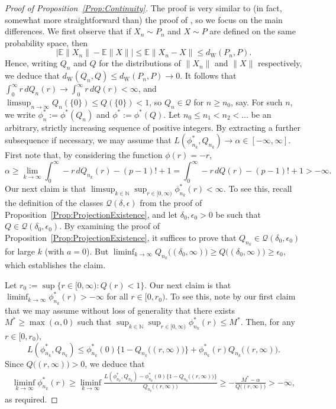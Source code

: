 \documentclass[a4paper,12pt]{article}
\begin{document}
\begin{proof}[Proof of Proposition~\ref{Prop:Continuity}]
The proof is very similar to (in fact, somewhat more straightforward than) the proof of \citet[][Theorem~4.5]{dumbgen2011approximation}, so we focus on the main differences.  We first observe that if $X_n \sim P_n$ and $X \sim P$ are defined on the same probability space, then 
\[
\bigl|\mathbb{E}\|X_n\| - \mathbb{E}\|X\|\bigr| \leq \mathbb{E}\|X_n-X\| \leq d_\mathrm{W}(P_n,P).
\]
Hence, writing $Q_n$ and $Q$ for the distributions of $\|X_n\|$ and $\|X\|$ respectively, we deduce that $d_\mathrm{W}(Q_n,Q) \leq d_\mathrm{W}(P_n,P) \rightarrow 0$.  It follows that $\int_0^\infty r \, dQ_n(r) \rightarrow \int_0^\infty r \, dQ(r) < \infty$, and $\limsup_{n \rightarrow \infty} Q_n(\{0\}) \leq Q(\{0\}) < 1$, so $Q_n \in \mathcal{Q}$ for $n \geq n_0$, say.  For such $n$, we write $\phi_n^* := \phi^*(Q_n)$ and $\phi^* := \phi^*(Q)$.  Let $n_0 \leq n_1 < n_2 < \ldots$ be an arbitrary, strictly increasing sequence of positive integers.  By extracting a further subsequence if necessary, we may assume that $L(\phi_{n_k}^*,Q_{n_k}) \rightarrow \alpha \in [-\infty,\infty]$.  First note that, by considering the function $\phi(r) = -r$,
\[
\alpha \geq \lim_{k \rightarrow \infty} \int_0^\infty -r \, dQ_{n_k}(r) - (p-1)! + 1 = \int_0^\infty -r \, dQ(r) - (p-1)! + 1 > -\infty.
\]
Our next claim is that $\limsup_{k \in \mathbb{N}} \sup_{r \in [0,\infty)} \phi_{n_k}^*(r) < \infty$.  To see this, recall the definition of the classes $\mathcal{Q}(\delta,\epsilon)$ from the proof of Proposition~\ref{Prop:ProjectionExistence}, and let $\delta_0,\epsilon_0 > 0$ be such that $Q \in \mathcal{Q}(\delta_0,\epsilon_0)$.  By examining the proof of Proposition~\ref{Prop:ProjectionExistence}, it suffices to prove that $Q_{n_k} \in \mathcal{Q}(\delta_0,\epsilon_0)$ for large $k$ (with $a=0$).  But $\liminf_{k \rightarrow \infty} Q_{n_k}\bigl((\delta_0,\infty)\bigr) \geq Q\bigl((\delta_0,\infty)\bigr) \geq \epsilon_0$, which establishes the claim.

Let $r_0 := \sup\{r \in [0,\infty):Q(r) < 1\}$.  Our next claim is that $\liminf_{k \rightarrow \infty} \phi_{n_k}^*(r) > -\infty$ for all $r \in [0,r_0)$.  To see this, note by our first claim that we may assume without loss of generality that there exists $M^* \geq \max(\alpha,0)$ such that $\sup_{k \in \mathbb{N}} \sup_{r \in [0,\infty)} \phi_{n_k}^*(r) \leq M^*$.  Then, for any $r \in [0,r_0)$, 
\[
L(\phi_{n_k}^*,Q_{n_k}) \leq \phi_{n_k}^*(0)\bigl\{1 - Q_{n_k}\bigl((r,\infty)\bigr)\bigr\} + \phi_{n_k}^*(r)Q_{n_k}\bigl((r,\infty)\bigr).
\]
Since $Q\bigl((r,\infty)\bigr) > 0$, we deduce that
\begin{align*}
\liminf_{k \rightarrow \infty} \phi_{n_k}^*(r) \geq \liminf_{k \rightarrow \infty} \frac{L(\phi_{n_k}^*,Q_{n_k}) - \phi_{n_k}^*(0)\bigl\{1 - Q_{n_k}\bigl((r,\infty)\bigr)\bigr\}}{Q_{n_k}\bigl((r,\infty)\bigr)} \geq -\frac{M^* - \alpha}{Q\bigl((r,\infty)\bigr)} > -\infty,
\end{align*}
as required.  


\end{proof}
\end{document}
